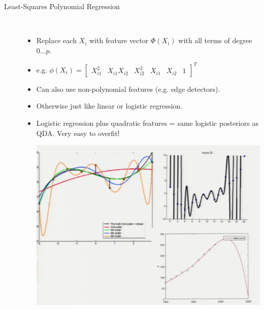 \documentclass[10pt]{article}
\begin{document}
\begin{description}
\begin{itemize}
\begin{center}
						\end{center}
				\end{itemize}
				
				\item[Least-Squares Polynomial Regression]
				\
					\begin{itemize}
						\item Replace each $X_{i}$ with feature vector $\Phi(X_{i})$ with all terms of degree $0 \dots p$.
						\item e.g. $\phi(X_{i}) = \begin{bmatrix}
												X_{i1}^{2} & X_{i1}X_{i2} & X_{i2}^{2} & X_{i1} & X_{i2} & 1 
 											\end{bmatrix}^{T}
 											$
 						\item Can also use non-polynomial features (e.g. edge detectors).
 						\item Otherwise just like linear or logistic regression.
 						\item Logistic regression plus quadratic features = same logistic posteriors as QDA. Very easy to overfit!
							\begin{center}
								\includegraphics[scale=0.5]{images/polyregression}
							\end{center}
					\end{itemize}
\end{description}
\end{document}
